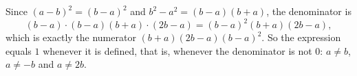 Since $(a-b)^2=(b-a)^2$ and $b^2-a^2=(b-a)(b+a)$, the denominator is
\[(b-a)\cdot(b-a)(b+a)\cdot(2b-a)=(b-a)^2(b+a)(2b-a),\]
which is exactly the numerator $(b+a)(2b-a)(b-a)^2$. So the expression equals $\boxed{1}$ whenever it is defined, that is, whenever the denominator is not $0$: $a\ne b$, $a\ne-b$ and $a\ne2b$.

